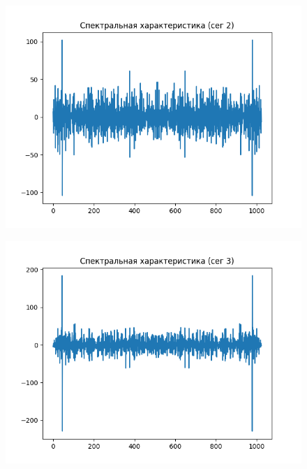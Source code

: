 \documentclass[12pt]{article}
\begin{document}
\begin{figure}[!htb]
\centering
\includegraphics[scale=1.00]{spec_2.png}
\caption{}
\label{}
\end{figure}

\begin{figure}[!htb]
\centering
\includegraphics[scale=1.00]{spec_3.png}
\caption{}
\label{}
\end{figure}
\end{document}

